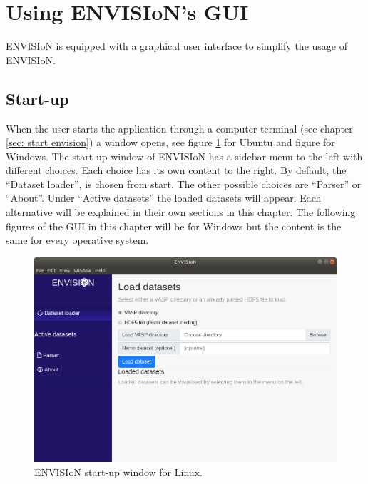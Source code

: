 \section{Using ENVISIoN's GUI}
\label{sec:GUI}
ENVISIoN is equipped with a graphical user interface to simplify the usage of ENVISIoN. 

\subsection{Start-up}
When the user starts the application through a computer terminal (see chapter \ref{sec: start envision}) a window opens, see figure \ref{fig:GUIStartupUbuntu} for Ubuntu and figure for Windows. The start-up window of ENVISIoN has a sidebar menu to the left with different choices. Each choice has its own content to the right. By default, the ``Dataset loader'', is chosen from start. The other possible choices are ``Parser'' or ``About''. Under ``Active datasets'' the loaded datasets will appear. Each alternative will be explained in their own sections in this chapter. The following figures of the GUI in this chapter will be for Windows but the content is the same for every operative system.

\begin{figure}[H]
    \centering
    \includegraphics[scale = 0.3]{images/GUI_start_Ubuntu.png}
    \caption{ENVISIoN start-up window for Linux.}
    \label{fig:GUIStartupUbuntu}
\end{figure}

